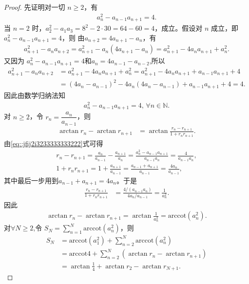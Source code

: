 \documentclass[../../main.tex]{subfiles}%
\begin{document}
\begin{proof}
先证明对一切 $n\geqslant 2$，有
\begin{align*}
a_n^2-a_{n-1}a_{n+1}=4.
\end{align*}
当 $n=2$ 时，$a_2^2-a_1a_3=8^2-2\cdot 30=64-60=4$，成立。假设对 $n$ 成立，即 $a_n^2-a_{n-1}a_{n+1}=4$，则
由$a_{n+2}=4a_{n+1}-a_n$，有
\begin{align*}
a_{n+1}^2-a_n a_{n+2}
=a_{n+1}^2-a_n(4a_{n+1}-a_n)
=a_{n+1}^2-4a_na_{n+1}+a_n^2.
\end{align*}
又因为 $a_n^2-a_{n-1}a_{n+1}=4$和$a_n=4a_{n-1}-a_{n-2}$,所以
\begin{align*}
a_{n+1}^{2}-a_na_{n+2}&=a_{n+1}^{2}-4a_na_{n+1}+a_{n}^{2}=a_{n+1}^{2}-4a_na_{n+1}+a_{n-1}a_{n+1}+4
\\
&=\left( 4a_n-a_{n-1} \right) ^2-4a_n\left( 4a_n-a_{n-1} \right) +a_{n-1}a_{n+1}+4=4.
\end{align*}
因此由数学归纳法知
\begin{align}
a_n^2-a_{n-1}a_{n+1}=4,\,\forall n\in \mathbb{N}.\label{eq::jfij2i3233333333222}
\end{align}
对 $n\geqslant 2$，令 $r_n=\dfrac{a_n}{a_{n-1}}$，则
\begin{align*}
\arctan r_n-\arctan r_{n+1}
&=\arctan\frac{r_n-r_{n+1}}{1+r_nr_{n+1}}.
\end{align*}
由\eqref{eq::jfij2i3233333333222}式可得
\begin{gather*}
r_n-r_{n+1}
=\frac{a_n}{a_{n-1}}-\frac{a_{n+1}}{a_n}
=\frac{a_n^2-a_{n-1}a_{n+1}}{a_{n-1}a_n}
=\frac{4}{a_{n-1}a_n}, \\
1+r_nr_{n+1}
=1+\frac{a_{n+1}}{a_{n-1}}
=\frac{a_{n-1}+a_{n+1}}{a_{n-1}}
=\frac{4a_n}{a_{n-1}},
\end{gather*}
其中最后一步用到$a_{n-1}+a_{n+1}=4a_n$。于是
\begin{align*}
\frac{r_n-r_{n+1}}{1+r_nr_{n+1}}
&=\frac{4/(a_{n-1}a_n)}{4a_n/a_{n-1}}
=\frac{1}{a_n^2}.
\end{align*}
因此
\begin{align*}
\arctan r_n-\arctan r_{n+1}
=\arctan\frac{1}{a_n^2}
=\text{arccot}(a_n^2).
\end{align*}
对$\forall N\geqslant 2$,令 $S_N=\sum_{n=1}^{N}\text{arccot}(a_n^2)$，则
\begin{align*}
S_N
&=\text{arccot}(a_1^2)+\sum_{n=2}^{N}\text{arccot}(a_n^2) \\
&=\text{arccot} 4+\sum_{n=2}^{N}(\arctan r_n-\arctan r_{n+1}) \\
&=\arctan\frac14+\arctan r_2-\arctan r_{N+1}.
\end{align*}

\end{proof}
\end{document}
